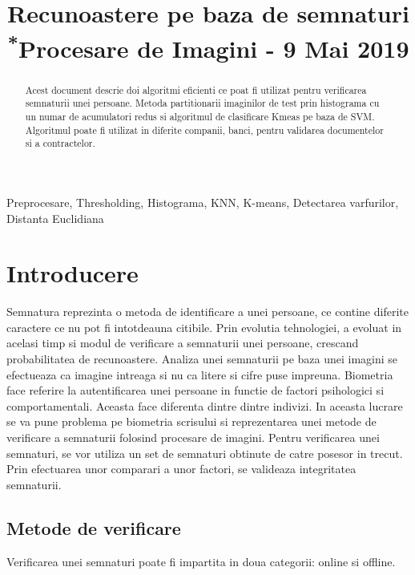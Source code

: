 \documentclass[conference]{IEEEtran}
\begin{document}
\title{Recunoastere pe baza de semnaturi\\
{\footnotesize \textsuperscript{*}Procesare de Imagini - 9 Mai 2019}
}

\author{
}

\maketitle

\begin{abstract}
Acest document descrie doi algoritmi eficienti ce poat fi utilizat pentru verificarea semnaturii unei persoane. Metoda partitionarii imaginilor de test prin histograma cu un numar de acumulatori redus si algoritmul de clasificare Kmeas pe baza de SVM. Algoritmul poate fi utilizat in diferite companii, banci, pentru validarea documentelor si a contractelor.
\end{abstract}

\begin{IEEEkeywords}
Preprocesare, Thresholding, Histograma, KNN, K-means, Detectarea varfurilor, Distanta Euclidiana
\end{IEEEkeywords}

\section{Introducere}
Semnatura reprezinta o metoda de identificare a unei persoane, ce contine diferite caractere ce nu pot fi intotdeauna citibile. Prin evolutia tehnologiei, a evoluat in acelasi timp si modul de verificare a semnaturii unei persoane, crescand probabilitatea de recunoastere. Analiza unei semnaturii pe baza unei imagini se efectueaza ca imagine intreaga si nu ca litere si cifre puse impreuna. Biometria face referire la autentificarea unei persoane in functie de factori psihologici si comportamentali. Aceasta face diferenta dintre dintre indivizi. In aceasta lucrare se va pune problema pe biometria scrisului si reprezentarea unei metode de verificare a semnaturii folosind procesare de imagini. Pentru verificarea unei semnaturi, se vor utiliza un set de semnaturi obtinute de catre posesor in trecut. Prin efectuarea unor comparari a unor factori, se valideaza integritatea semnaturii. 

\subsection{Metode de verificare}
Verificarea unei semnaturi poate fi impartita in doua categorii: online si offline.
\end{document}
